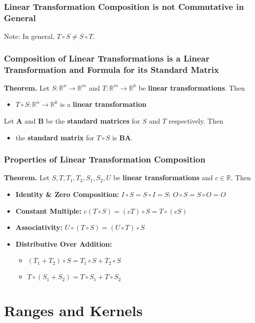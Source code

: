 \documentclass[../ma2001_notes.tex]{subfiles}
\begin{document}
\subsubsection{Linear Transformation Composition is not Commutative in General}
Note: In general, \(T\circ S\ne S\circ T\).

\subsubsection{Composition of Linear Transformations is a Linear Transformation and Formula for its Standard Matrix}
\textbf{Theorem.} Let \(S:\mathbb{R}^n\to\mathbb{R}^m\) and \(T:\mathbb{R}^m\to\mathbb{R}^k\) be \textbf{linear transformations}. Then
\begin{itemize}
	\item\(T\circ S:\mathbb{R}^n\to\mathbb{R}^k\) is a \textbf{linear transformation}
\end{itemize}
Let \(\bm{A}\) and \(\bm{B}\) be the \textbf{standard matrices} for \(S\) and \(T\) respectively. Then
\begin{itemize}
	\item the \textbf{standard matrix} for \(T\circ S\) is \(\bm{BA}\).
\end{itemize}

\subsubsection{Properties of Linear Transformation Composition}
\textbf{Theorem.} Let \(S,T,T_1,T_2,S_1,S_2,U\) be \textbf{linear transformations} and \(c\in\mathbb{R}\). Then
\begin{itemize}
	\item\textbf{Identity \& Zero Composition:} \(I\circ S=S\circ I=S\); \(O\circ S=S\circ O=O\)
	\item\textbf{Constant Multiple:} \(c(T\circ S)=(cT)\circ S=T\circ(cS)\)
	\item\textbf{Associativity:} \(U\circ(T\circ S)=(U\circ T)\circ S\)
	\item\textbf{Distributive Over Addition:}
	\begin{itemize}
		\item\((T_1+T_2)\circ S=T_1\circ S+T_2\circ S\)
		\item\(T\circ(S_1+S_2)=T\circ S_1+T\circ S_2\)
	\end{itemize}
\end{itemize}

\section{Ranges and Kernels}
\end{document}
